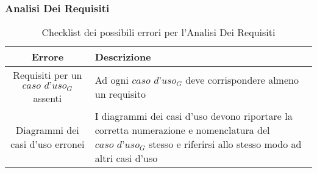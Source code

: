 \subsubsection{Analisi Dei Requisiti}
\begin{table}[H]
\centering
\begin{tabular}{|c|p{8cm}|}
\hline
\textbf{Errore} & \textbf{Descrizione} \\
\hline
Requisiti per un $\textit{caso d'uso}_G$ assenti &  Ad ogni $\textit{caso d'uso}_G$ deve corrispondere almeno un requisito\\
\hline
Diagrammi dei casi d'uso erronei & I diagrammi dei casi d'uso devono riportare la corretta numerazione e nomenclatura del $\textit{caso d'uso}_G$ stesso e riferirsi allo stesso modo ad altri casi d'uso\\
\hline
\end{tabular}
\caption{Checklist dei possibili errori per l'Analisi Dei Requisiti}
\end{table}